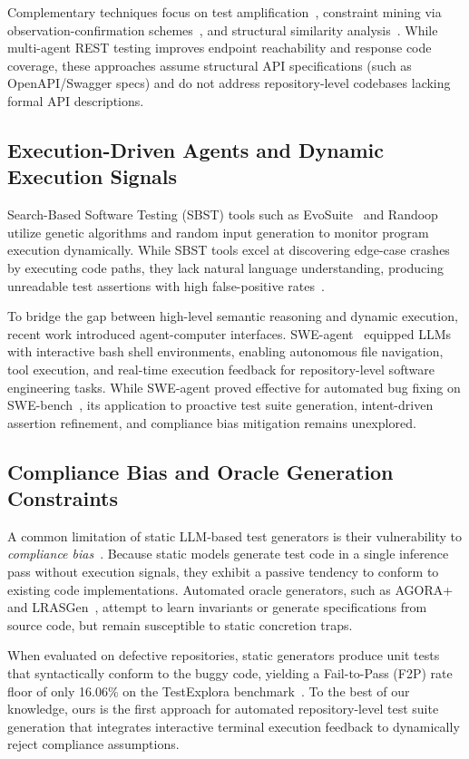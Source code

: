 Complementary techniques focus on test amplification~\cite{amplification2025}, constraint mining via observation-confirmation schemes~\cite{rbctest2024}, and structural similarity analysis~\cite{isdfs2026}. While multi-agent REST testing improves endpoint reachability and response code coverage, these approaches assume structural API specifications (such as OpenAPI/Swagger specs) and do not address repository-level codebases lacking formal API descriptions.

\subsection{Execution-Driven Agents and Dynamic Execution Signals}
Search-Based Software Testing (SBST) tools such as EvoSuite~\cite{evosuite} and Randoop~\cite{randoop} utilize genetic algorithms and random input generation to monitor program execution dynamically. While SBST tools excel at discovering edge-case crashes by executing code paths, they lack natural language understanding, producing unreadable test assertions with high false-positive rates~\cite{siddiq2023exploratory}.

To bridge the gap between high-level semantic reasoning and dynamic execution, recent work introduced agent-computer interfaces. SWE-agent~\cite{sweagent} equipped LLMs with interactive bash shell environments, enabling autonomous file navigation, tool execution, and real-time execution feedback for repository-level software engineering tasks. While SWE-agent proved effective for automated bug fixing on SWE-bench~\cite{swebench}, its application to proactive test suite generation, intent-driven assertion refinement, and compliance bias mitigation remains unexplored.

\subsection{Compliance Bias and Oracle Generation Constraints}
A common limitation of static LLM-based test generators is their vulnerability to \textit{compliance bias}~\cite{testexplora}. Because static models generate test code in a single inference pass without execution signals, they exhibit a passive tendency to conform to existing code implementations. Automated oracle generators, such as AGORA+~\cite{agoraplus2025} and LRASGen~\cite{lrasgen2026}, attempt to learn invariants or generate specifications from source code, but remain susceptible to static concretion traps.

When evaluated on defective repositories, static generators produce unit tests that syntactically conform to the buggy code, yielding a Fail-to-Pass (F2P) rate floor of only 16.06\% on the TestExplora benchmark~\cite{testexplora}. To the best of our knowledge, ours is the first approach for automated repository-level test suite generation that integrates interactive terminal execution feedback to dynamically reject compliance assumptions.
